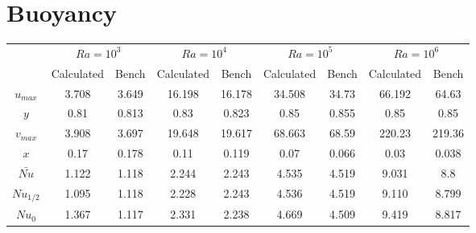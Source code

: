 \chapter{Buoyancy}

\begin{table}[h]
	\centering
	\begin{tabular}{c|c|c|c|c|c|c|c|c|}
		\cline{2-9}
		\multicolumn{1}{l|}{}       & \multicolumn{2}{c|}{$Ra=10^{3}$} & \multicolumn{2}{c|}{$Ra=10^{4}$} & \multicolumn{2}{c|}{$Ra=10^{5}$} & \multicolumn{2}{c|}{$Ra=10^{6}$} \\ \cline{2-9} 
		\multicolumn{1}{l|}{}       & Calculated                & Bench                & Calculated                & Bench                & Calculated                & Bench                & Calculated                & Bench                \\ \hline
		\multicolumn{1}{|c|}{$u_{max}$}  & 3.708                   & 3.649                & 16.198                   & 16.178               & 34.508                   & 34.73                & 66.192                   & 64.63                \\ \hline
		\multicolumn{1}{|c|}{$y$}     & 0.81                      & 0.813                & 0.83                      & 0.823                & 0.85                      & 0.855                & 0.85                      & 0.85                 \\ \hline
		\multicolumn{1}{|c|}{$v_{max}$}  & 3.908                    & 3.697                & 19.648                   & 19.617               & 68.663                    & 68.59                & 220.23                    & 219.36               \\ \hline
		\multicolumn{1}{|c|}{$x$}     & 0.17                      & 0.178                & 0.11                      & 0.119                & 0.07                      & 0.066                & 0.03                      & 0.038               \\ \hline
		\multicolumn{1}{|c|}{$\bar{Nu}$} & 1.122                     & 1.118                & 2.244                   & 2.243                & 4.535                   & 4.519                & 9.031                   & 8.8                  \\ \hline
		\multicolumn{1}{|c|}{$Nu_{1/2}$}  & 1.095                   & 1.118                & 2.228                   & 2.243                & 4.536                   & 4.519                & 9.110                   & 8.799                \\ \hline
		\multicolumn{1}{|c|}{$Nu_{0}$}   & 1.367                   & 1.117                & 2.331                   & 2.238                & 4.669                   & 4.509                & 9.419                   & 8.817                \\ \hline

\end{tabular}
\end{table}
